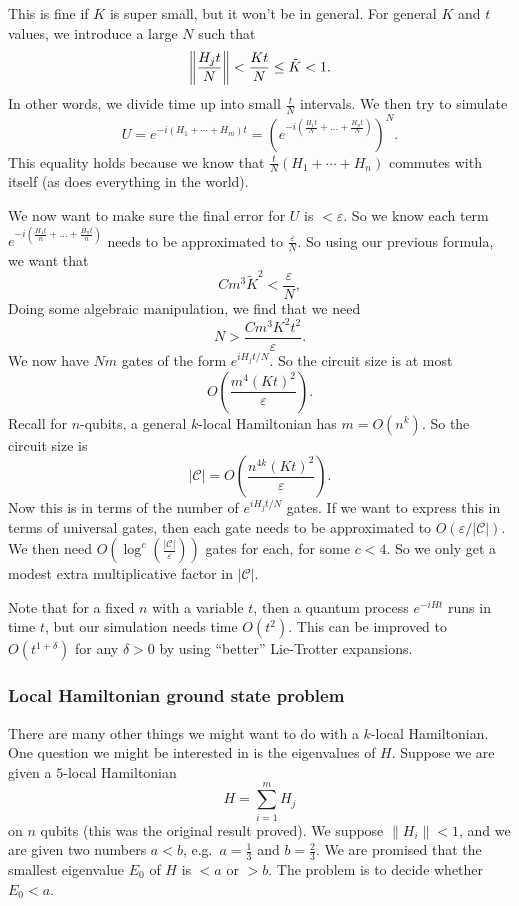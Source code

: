 This is fine if $K$ is super small, but it won't be in general. For general $K$ and $t$ values, we introduce a large $N$ such that
\[
  \left\lVert \frac{H_j t}{N}\right\rVert < \frac{Kt}{N} \leq \tilde{K} < 1.
\]
In other words, we divide time up into small $\frac{t}{N}$ intervals. We then try to simulate
\[
  U = e^{-i (H_1 + \cdots + H_m)t } = \left(e^{-i \left(\frac{H_1 t}{N} + \ldots + \frac{H_n t}{N}\right)}\right)^N.
\]
This equality holds because we know that $\frac{t}{N}(H_1 + \cdots + H_n)$ commutes with itself (as does everything in the world).

We now want to make sure the final error for $U$ is $< \varepsilon$. So we know each term $e^{-i \left(\frac{H_1 t}{n} + \ldots + \frac{H_n t}{n}\right)}$ needs to be approximated to $\frac{\varepsilon}{N}$. So using our previous formula, we want that
\[
  Cm^3 \tilde{K}^2 < \frac{\varepsilon}{N},
\]
Doing some algebraic manipulation, we find that we need
\[
  N > \frac{Cm^3 K^2 t^2}{\varepsilon}.
\]
We now have $Nm$ gates of the form $e^{iH_j t/N}$. So the circuit size is at most
\[
  O\left(\frac{m^4(Kt)^2}{\varepsilon}\right).
\]
Recall for $n$-qubits, a general $k$-local Hamiltonian has $m = O(n^k)$. So the circuit size is
\[
  |\mathcal{C}| = O\left(\frac{n^{4k} (Kt)^2}{\varepsilon}\right).
\]
Now this is in terms of the number of $e^{iH_j t/N}$ gates. If we want to express this in terms of universal gates, then each gate needs to be approximated to $O(\varepsilon/|\mathcal{C}|)$. We then need $O(\log^c(\frac{|\mathcal{C}|}{\varepsilon}))$ gates for each, for some $c < 4$. So we only get a modest extra multiplicative factor in $|\mathcal{C}|$.

Note that for a fixed $n$ with a variable $t$, then a quantum process $e^{-iHt}$ runs in time $t$, but our simulation needs time $O(t^2)$. This can be improved to $O(t^{1 + \delta})$ for any $\delta > 0$ by using ``better'' Lie-Trotter expansions.

\subsubsection*{Local Hamiltonian ground state problem}
There are many other things we might want to do with a $k$-local Hamiltonian. One question we might be interested in is the eigenvalues of $H$. Suppose we are given a $5$-local Hamiltonian
\[
  H = \sum_{i = 1}^m H_j
\]
on $n$ qubits (this was the original result proved). We suppose $\|H_i\| < 1$, and we are given two numbers $a < b$, e.g.\ $a = \frac{1}{3}$ and $b = \frac{2}{3}$. We are promised that the smallest eigenvalue $E_0$ of $H$ is $ < a$ or $> b$. The problem is to decide whether $E_0 < a$.

